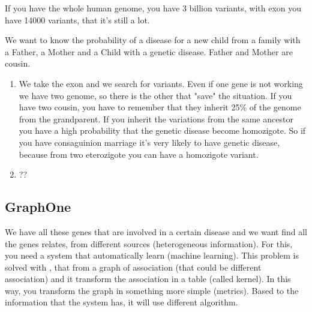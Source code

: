 If you have the whole human genome, you have 3 billion variants, with exon you 
have 14000 variants, that it's still a lot.

We want to know the probability of a disease for a new child from a family with 
a Father, a Mother and a Child with a genetic disease. Father and Mother are 
cousin.
\begin{enumerate}
	\item We take the exon and we search for variants. Even if one gene is not 
	working we have two genome, so there is the other that "save" the situation.
	If you have two cousin, you have to remember that they inherit 25\% of the 
	genome from the grandparent. If you inherit the variations from the same 
	ancestor you have a high probability that the genetic disease become 
	homozigote. So if you have consaguinion marriage it's very likely to have 
	genetic disease, because from two eterozigote you can have a homozigote 
	variant.
	\item ?? %
\end{enumerate}

\subsection{GraphOne}
We have all these genes that are involved in a certain disease and we want find 
all the genes relates, from different sources (heterogeneous information). For 
this, you need a system that automatically learn (machine learning). This 
problem is solved with , that from a graph of association (that 
could be different association) and it transform the association in a table 
(called kernel). In this way, you transform the graph in something more simple 
(metrics). 
Based to the information that the system has, it will use different algorithm.

